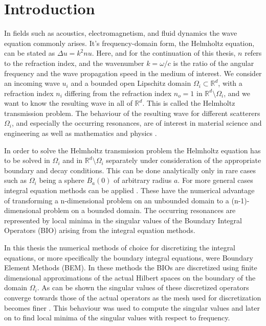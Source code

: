 \documentclass[a4paper, oneside]{thirdparty_stylesheets/discothesis}
\begin{document}
\chapter{Introduction}
In fields such as acoustics, electromagnetism, and fluid dynamics the wave equation commonly arises. 
It's frequency-domain form, the Helmholtz equation, can be stated as $ \Delta u = k^2 n u $. 
Here, and for the continuation of this thesis, $n$ refers to the refraction index, and the wavenumber $k=\omega/c$ is the ratio of the angular frequency and the wave propagation speed in the medium of interest.
We consider an incoming wave $u_i$ and a bounded open Lipschitz domain $\Omega_i \subset \mathbb{R}^d$, with a refraction index $n_i$ differing from the refraction index $n_o=1$ in $\mathbb{R}^d\setminus\Omega_i$, and we want to know the resulting wave in all of $\mathbb{R}^d$. 
This is called the Helmholtz transmission problem.
The behaviour of the resulting wave for different scatterers $\Omega_i$, and especially the occurring resonances, are of interest in material science and engineering as well as mathematics and physics \cite{PhysRevLett.97.206806} \cite{matscat} \cite{emscat}.

In order to solve the Helmholtz transmission problem the Helmholtz equation has to be solved in $\Omega_i$ and in $\mathbb{R}^d\setminus\Omega_i$ separately under consideration of the appropriate boundary and decay conditions.
This can be done analytically only in rare cases such as $\Omega_i$ being a sphere $B_{a}(0)$ of arbitrary radius $a$. 
For more general cases integral equation methods can be applied \cite{doi:10.1137/1.9781611973167}. 
These have the numerical advantage of transforming a n-dimensional problem on an unbounded domain to a (n-1)-dimensional problem on a bounded domain. 
The occurring resonances are represented by local minima in the singular values of the Boundary Integral Operators (BIO) arising from the integral equation methods.

In this thesis the numerical methods of choice for discretizing the integral equations, or more specifically the boundary integral equations, were Boundary Element Methods (BEM).
In these methods the BIOs are discretized using finite dimensional approximations of the actual Hilbert spaces on the boundary of the domain $\Omega_i$.
As can be shown the singular values of these discretized operators converge towards those of the actual operators as the mesh used for discretization becomes finer \cite{svdap}.
This behaviour was used to compute the singular values and later on to find local minima of the singular values with respect to frequency.
\end{document}
